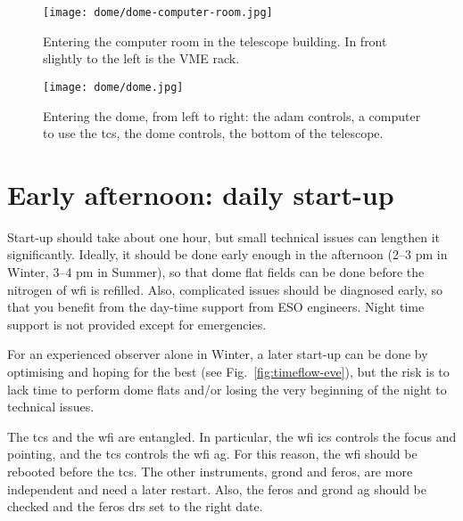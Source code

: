 \documentclass[11pt,fleqn]{book} %
\begin{document}
\begin{figure}[!ht]
\centering
\texttt{[image: dome/dome-computer-room.jpg]}
\caption[Entering the computer room in the telescope building]{Entering the computer room in the telescope building. In front slightly to the left is the VME rack.} 
\label{fig:computer-room}
\end{figure}

\begin{figure}[!ht]
\centering
\texttt{[image: dome/dome.jpg]}
\caption[Entering the dome]{Entering the dome, from left to right: the \gls{adam} controls,
a computer to use the \gls{tcs}, the dome controls, the bottom of the telescope.}
\label{fig:dome}
\end{figure}

\cleardoublepage



%                                       
%                                  
%
%


\chapter{Early afternoon: daily start-up}
\label{startup}

Start-up should take about one hour, but small technical issues can lengthen it significantly.  Ideally, it should be done early enough in the afternoon (2--3 pm in Winter, 3--4 pm in Summer), so that dome flat fields can be done before the nitrogen of \gls{wfi} is refilled.  Also, complicated issues should be diagnosed early, so that you benefit from the day-time support from ESO engineers.  Night time support is not provided except for emergencies.

For an experienced observer alone in Winter, a later start-up can be done by optimising and hoping for the best (see Fig.~\ref{fig:timeflow-eve}), but the risk is to lack time to perform dome flats and/or losing the very beginning of the night to technical issues.

The \gls{tcs} and the \gls{wfi} are entangled.  In particular, the \gls{wfi} \gls{ics} controls the focus and pointing, and the \gls{tcs} controls the \gls{wfi} \gls{ag}.  For this reason, the \gls{wfi} should be rebooted before the \gls{tcs}.  The other instruments, \gls{grond} and \gls{feros}, are more independent and need a later restart. Also, the \gls{feros} and \gls{grond} \gls{ag} should be checked and the \gls{feros} \gls{drs} set to the right date.
\end{document}
